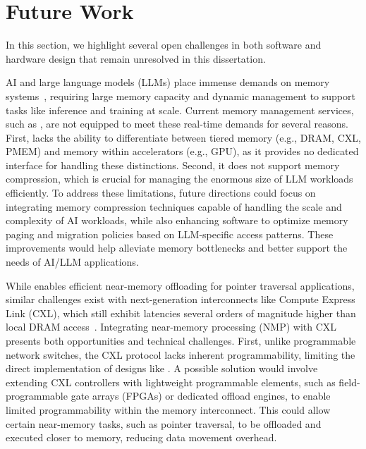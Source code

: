 \section{Future Work}
\label{sec:cxlkv}

In this section, we highlight several open challenges in both software and hardware design that remain unresolved in this dissertation. 




AI and large language models (LLMs) place immense demands on memory systems~\cite{pagedattenion, liu2023cachegen}, requiring large memory capacity and dynamic management to support tasks like inference and training at scale. Current memory management services, such as \jiffy, are not equipped to meet these real-time demands for several reasons. First, \jiffy lacks the ability to differentiate between tiered memory (e.g., DRAM, CXL, PMEM) and memory within accelerators (e.g., GPU), as it provides no dedicated interface for handling these distinctions. Second, it does not support memory compression, which is crucial for managing the enormous size of LLM workloads efficiently. To address these limitations, future directions could focus on integrating memory compression techniques capable of handling the scale and complexity of AI workloads, while also enhancing software to optimize memory paging and migration policies based on LLM-specific access patterns. These improvements would help alleviate memory bottlenecks and better support the needs of AI/LLM applications.



While \pulse enables efficient near-memory offloading for pointer traversal applications, similar challenges exist with next-generation interconnects like Compute Express Link (CXL), which still exhibit latencies several orders of magnitude higher than local DRAM access~\cite{pond}. Integrating near-memory processing (NMP) with CXL presents both opportunities and technical challenges. First, unlike programmable network switches, the CXL protocol lacks inherent programmability, limiting the direct implementation of designs like \pulse. A possible solution would involve extending CXL controllers with lightweight programmable elements, such as field-programmable gate arrays (FPGAs) or dedicated offload engines, to enable limited programmability within the memory interconnect. This could allow certain near-memory tasks, such as pointer traversal, to be offloaded and executed closer to memory, reducing data movement overhead.

